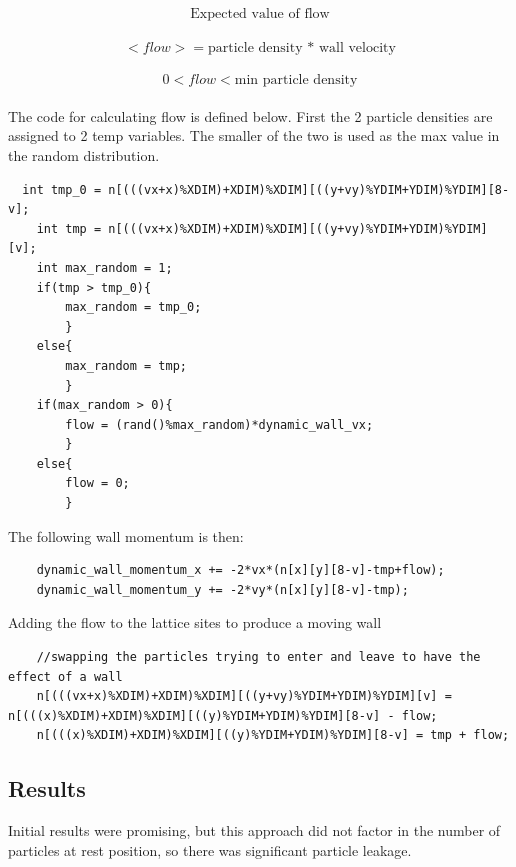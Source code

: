 \documentclass{article}
\begin{document}
$$
\textrm{Expected value of flow}$$\\
$$<flow> = \textrm{particle density * wall velocity}$$\\
$$0 < flow < \textrm{min particle density}$$\\




The code for calculating flow is defined below. First the 2 particle densities are assigned to 2 temp variables. The smaller of the two is used as the max value in the random distribution. 
\begin{verbatim}
  int tmp_0 = n[(((vx+x)%XDIM)+XDIM)%XDIM][((y+vy)%YDIM+YDIM)%YDIM][8-v];
    int tmp = n[(((vx+x)%XDIM)+XDIM)%XDIM][((y+vy)%YDIM+YDIM)%YDIM][v];
	int max_random = 1;
	if(tmp > tmp_0){
		max_random = tmp_0;
		}
	else{
		max_random = tmp;
		}
	if(max_random > 0){
		flow = (rand()%max_random)*dynamic_wall_vx;
		}
	else{
		flow = 0;
		}
\end{verbatim}
\vspace{5mm}
The following wall momentum is then:
\begin{verbatim}
    dynamic_wall_momentum_x += -2*vx*(n[x][y][8-v]-tmp+flow);
    dynamic_wall_momentum_y += -2*vy*(n[x][y][8-v]-tmp);
    \end{verbatim}
\vspace{5mm}


\vspace{5mm}
Adding the flow to the lattice sites to produce a moving wall
\begin{verbatim}
    //swapping the particles trying to enter and leave to have the effect of a wall
    n[(((vx+x)%XDIM)+XDIM)%XDIM][((y+vy)%YDIM+YDIM)%YDIM][v] = n[(((x)%XDIM)+XDIM)%XDIM][((y)%YDIM+YDIM)%YDIM][8-v] - flow;
    n[(((x)%XDIM)+XDIM)%XDIM][((y)%YDIM+YDIM)%YDIM][8-v] = tmp + flow;		
    \end{verbatim}
\vspace{5mm}

\subsection{Results}

Initial results were promising, but this approach did not factor in the number of particles at rest position, so there was significant particle leakage.
\end{document}
